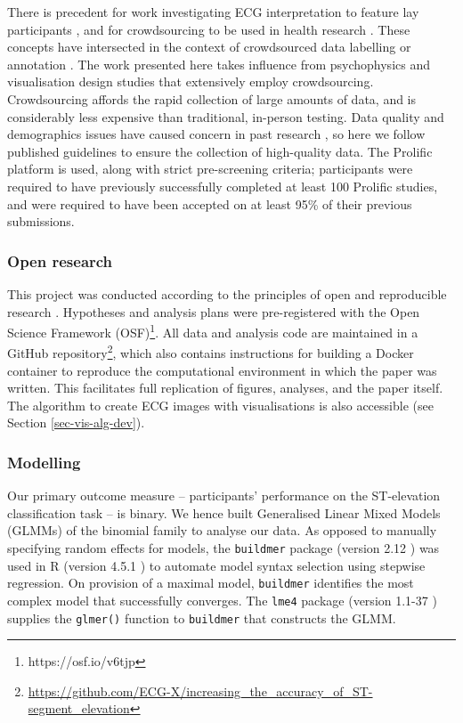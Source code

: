 \documentclass[
  10pt,
  letterpaper,
]{article}
\begin{document}
There is precedent for work investigating ECG interpretation to feature
lay participants \citep{alahmadi_2020}, and for crowdsourcing to be used
in health research \citep{crequit_2018}. These concepts have intersected
in the context of crowdsourced data labelling or annotation
\citep{zhu_2014, bahrami_2021, bahrami_2024}. The work presented here
takes influence from psychophysics and visualisation design studies that
extensively employ crowdsourcing. Crowdsourcing affords the rapid
collection of large amounts of data, and is considerably less expensive
than traditional, in-person testing. Data quality and demographics
issues have caused concern in past research
\citep{chmielewski_2020, peer_2021}, so here we follow published
guidelines \citep{peer_2021} to ensure the collection of high-quality
data. The Prolific platform \citep{prolific} is used, along with strict
pre-screening criteria; participants were required to have previously
successfully completed at least 100 Prolific studies, and were required
to have been accepted on at least 95\% of their previous submissions.

\subsubsection{Open research}\label{sec-open-research}

This project was conducted according to the principles of open and
reproducible research \citep{ayris_2018}. Hypotheses and analysis plans
were pre-registered with the Open Science Framework
(OSF)\footnote{https://osf.io/v6tjp}. All data and analysis code are
maintained in a GitHub
repository\footnote{\url{https://github.com/ECG-X/increasing_the_accuracy_of_ST-segment_elevation}},
which also contains instructions for building a Docker container to
reproduce the computational environment in which the paper was written.
This facilitates full replication of figures, analyses, and the paper
itself. The algorithm to create ECG images with visualisations is also
accessible (see Section \ref{sec-vis-alg-dev}).

\subsubsection{Modelling}\label{sec-modelling}

Our primary outcome measure -- participants' performance on the
ST-elevation classification task -- is binary. We hence built
Generalised Linear Mixed Models (GLMMs) of the binomial family to
analyse our data. As opposed to manually specifying random effects for
models, the \texttt{buildmer} package (version 2.12 \citep{voeten_2025})
was used in R (version 4.5.1 \citep{rcore}) to automate model syntax
selection using stepwise regression. On provision of a maximal model,
\texttt{buildmer} identifies the most complex model that successfully
converges. The \texttt{lme4} package (version 1.1-37 \citep{bates_2015})
supplies the \texttt{glmer()} function to \texttt{buildmer} that
constructs the GLMM.
\end{document}
